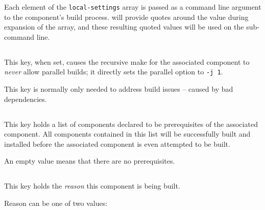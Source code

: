 Each element of the \texttt{local-settings} array is passed as a
command line argument to the component's build process.  \lmsbw will
provide quotes around the value during expansion of the array, and
these resulting quoted values will be used on the sub-\make command
line.


\subsection{}\label{variables:no-parallel}

This key, when set, causes the recursive make for the associated
component to \emph{never} allow parallel builds; it directly sets the
\gnumake parallel option to \texttt{-j 1}.

This key is normally only needed to address build issues -- caused by
bad dependencies.


\subsection{}\label{variables:prerequisite}

This key holds a list of components declared to be prerequisites of
the associated component.  All components contained in this list will
be successfully built and installed before the associated component is
even attempted to be built.

An empty value means that there are no prerequisites.


\subsection{}\label{variables:reason}

This key holds the \emph{reason} this component is being built.

Reason can be one of two values:

